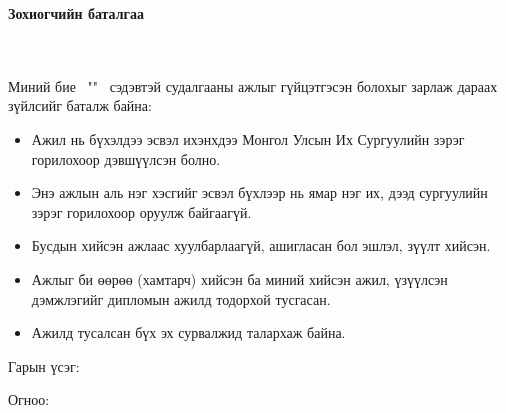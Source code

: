 \makefrontpage
\maketitle
{}

\doublespace

\begin{huge}
\textbf{Зохиогчийн баталгаа}
\end{huge} \\ \ \\ 
\doublespace
Миний бие \@author \ "\@title" \ сэдэвтэй судалгааны ажлыг гүйцэтгэсэн болохыг зарлаж дараах зүйлсийг баталж байна:
\begin{itemize}
\item Ажил нь бүхэлдээ эсвэл ихэнхдээ Монгол Улсын Их Сургуулийн зэрэг горилохоор дэвшүүлсэн болно.
\item Энэ ажлын аль нэг хэсгийг эсвэл бүхлээр нь ямар нэг их, дээд сургуулийн зэрэг горилохоор оруулж байгаагүй.
\item Бусдын хийсэн ажлаас хуулбарлаагүй, ашигласан бол эшлэл, зүүлт хийсэн.
\item Ажлыг би өөрөө (хамтарч) хийсэн ба миний хийсэн ажил, үзүүлсэн дэмжлэгийг дипломын ажилд тодорхой тусгасан. 
\item Ажилд тусалсан бүх эх сурвалжид талархаж байна. 
\end{itemize} 


Гарын үсэг: \underline{\hspace{5cm}} 

Огноо: 	\ \ \underline{\hspace{3cm}}

\setcounter{tocdepth}{1}
\tableofcontents

\listoffigures

\listoftables

\lstlistoflistings

\newpage
\newpage

\renewcommand{\cftlabel}{Зураг}


\doublespace
{}
